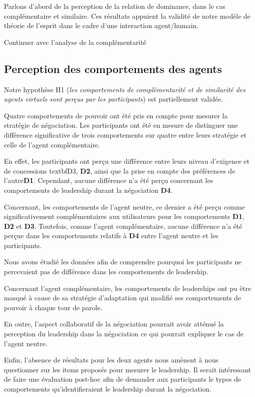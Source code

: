 Parlons d'abord de la perception de la relation de dominance, dans le cas complémentaire et similaire. Ces résultats appuient la validité de notre modèle de théorie de l'esprit dans le cadre d'une interaction agent/humain.   

Continuer avec l'analyse de la complémentarité 

\subsection{Perception des comportements des agents}
Notre hypothèse H1 (\textit{les comportements de complémentarité et de similarité des agents virtuels sont perçus par les participants}) est partiellement validée. 

Quatre comportements de pouvoir ont été pris en compte pour mesurer la stratégie de négociation. 
Les participants ont été en mesure de distinguer une différence significative de trois comportements sur quatre entre leurs stratégie et celle de l'agent complémentaire.

En effet, les participants ont perçu une différence entre leurs niveau d'exigence et de concessions textbf{D3}, \textbf{D2}, ainsi que la prise en compte des préférences de l'autre\textbf{D1}. Cependant, aucune différence n'a été perçu concernant les comportements de leadership durant la négociation \textbf{D4}. 

Concernant, les comportements de l'agent neutre, ce dernier a été perçu comme significativement complémentaires aux utilisateurs pour les comportements \textbf{D1}, \textbf{D2} et \textbf{D3}. 
Toutefois, comme l'agent complémentaire, aucune différence n'a été perçue dans les comportements relatifs à \textbf{D4} entre l'agent neutre et les participants. 

Nous avons étudié les données afin de comprendre pourquoi les participants ne percevaient pas de différence dans les comportements de leadership. 

Concernant l'agent complémentaire, les comportements de leaderships ont pu être masqué à cause de  sa stratégie d'adaptation qui modifié ses comportements de pouvoir à chaque tour de parole.

En outre, l'aspect collaboratif de la négociation pourrait avoir atténué la perception du leadership dans la négociation ce qui pourrait expliquer le cas de l'agent neutre. 
  
Enfin, l'absence de résultats pour les deux agents nous amènent à nous questionner sur les items proposés pour mesurer le leadership. 
 Il serait intéressant de faire une évaluation post-hoc afin de demander aux participants le types de comportements qu'identifieraient le leadership durant la négociation.

